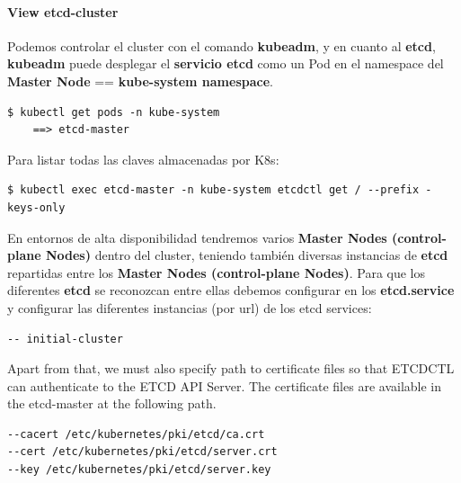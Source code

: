 \documentclass{article}
\newenvironment{codetemplate}[1][]{%
  \mybasecolorbox[#1]
  \itshape
}{%
  \endmybasecolorbox
}
\begin{document}
\paragraph{View etcd-cluster}

Podemos controlar el cluster con el comando \textbf{kubeadm}, y en cuanto al \textbf{etcd}, \textbf{kubeadm} puede desplegar el \textbf{servicio etcd} como un Pod en el namespace del \textbf{Master Node} == \textbf{kube-system namespace}.

\begin{codetemplate}{}
\begin{verbatim}
$ kubectl get pods -n kube-system
    ==> etcd-master
\end{verbatim}
\end{codetemplate}

Para listar todas las claves almacenadas por K8s:

\begin{codetemplate}{}
\begin{verbatim}
$ kubectl exec etcd-master -n kube-system etcdctl get / --prefix -keys-only
\end{verbatim}
\end{codetemplate}

En entornos de alta disponibilidad tendremos varios \textbf{Master Nodes (control-plane Nodes)} dentro del cluster, teniendo también diversas instancias de \textbf{etcd} repartidas entre los \textbf{Master Nodes (control-plane Nodes)}. Para que los diferentes \textbf{etcd} se reconozcan entre ellas debemos configurar en los \textbf{etcd.service} y configurar las diferentes instancias (por url) de los etcd services:

\begin{codetemplate}{}
\begin{verbatim}
-- initial-cluster
\end{verbatim}
\end{codetemplate}

Apart from that, we must also specify path to certificate files so that ETCDCTL can authenticate to the ETCD API Server. The certificate files are available in the etcd-master at the following path. 

\begin{codetemplate}{}
\begin{verbatim}
--cacert /etc/kubernetes/pki/etcd/ca.crt     
--cert /etc/kubernetes/pki/etcd/server.crt     
--key /etc/kubernetes/pki/etcd/server.key
\end{verbatim}
\end{codetemplate}
\end{document}

